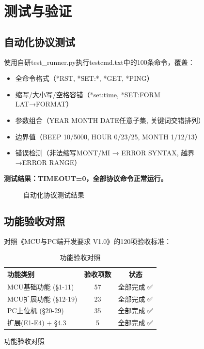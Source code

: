 \documentclass[12pt,hyperref,a4paper,UTF8]{ctexart}
\begin{document}
\begin{figure}[!htbp]
\section{测试与验证}

\subsection{自动化协议测试}

使用自研test\_runner.py执行testcmd.txt中的100条命令，覆盖：

\begin{itemize}
    \item 全命令格式（*RST, *SET:*, *GET, *PING）
    \item 缩写/大小写/空格容错（*set:time, *SET:FORM LAT→FORMAT）
    \item 参数组合（YEAR MONTH DATE任意子集, 关键词交错排列）
    \item 边界值（BEEP 10/5000, HOUR 0/23/25, MONTH 1/12/13）
    \item 错误检测（非法缩写MONT/MI → ERROR SYNTAX, 越界→ERROR RANGE）
\end{itemize}

\textbf{测试结果：TIMEOUT=0，全部协议命令正常运行。}

\begin{figure}[!htbp]
    \centering
    \caption{自动化协议测试结果}
    \label{fig:test}
\end{figure}

\subsection{功能验收对照}

对照《MCU与PC端开发要求 V1.0》的120项验收标准：

\begin{table}[!htbp]
    \centering
    \begin{tabular}{l|c|c}
    \hline
    \textbf{功能类别} & \textbf{验收项数} & \textbf{状态} \\
    \hline
    MCU基础功能 (§1-11) & 57 & 全部完成 ✅ \\
    MCU扩展功能 (§12-19) & 23 & 全部完成 ✅ \\
    PC上位机 (§20-29) & 35 & 全部完成 ✅ \\
    扩展(E1-E4) + §4.3 & 5 & 全部完成 ✅ \\
    \hline
    \end{tabular}
    \caption{功能验收对照}
\end{table}


\end{figure}
\end{document}
